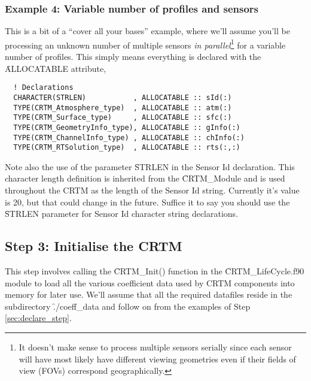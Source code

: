 \subsubsection{Example 4: Variable number of profiles and sensors}
\label{sec:declare_step_allvar_ex}
This is a bit of a ``cover all your bases'' example, where we'll assume you'll be processing an unknown number of multiple sensors \textit{in parallel}\footnote{It doesn't make sense to process multiple sensors serially since each sensor will have most likely have different viewing geometries even if their fields of view (FOVs) correspond geographically.} for a variable number of profiles. This simply means everything is declared with the \f{ALLOCATABLE} attribute,
\begin{ttfamily}
  \begin{verbatim}
  ! Declarations
  CHARACTER(STRLEN)           , ALLOCATABLE :: sId(:)
  TYPE(CRTM_Atmosphere_type)  , ALLOCATABLE :: atm(:)
  TYPE(CRTM_Surface_type)     , ALLOCATABLE :: sfc(:)
  TYPE(CRTM_GeometryInfo_type), ALLOCATABLE :: gInfo(:)  
  TYPE(CRTM_ChannelInfo_type) , ALLOCATABLE :: chInfo(:)
  TYPE(CRTM_RTSolution_type)  , ALLOCATABLE :: rts(:,:)\end{verbatim}
\end{ttfamily}
Note also the use of the parameter \f{STRLEN} in the Sensor Id declaration. This character length definition is inherited from the \f{CRTM\_Module} and is used throughout the CRTM as the length of the Sensor Id string. Currently it's value is 20, but that could change in the future. Suffice it to say you should use the \f{STRLEN} parameter for Sensor Id character string declarations.

\subsection{Step 3: Initialise the CRTM}
This step involves calling the \f{CRTM\_Init()} function in the \f{CRTM\_LifeCycle.f90} module to load all the various coefficient data used by CRTM components into memory for later use. We'll assume that all the required datafiles reside in the subdirectory \f{./coeff\_data} and follow on from the examples of Step \ref{sec:declare_step}.

